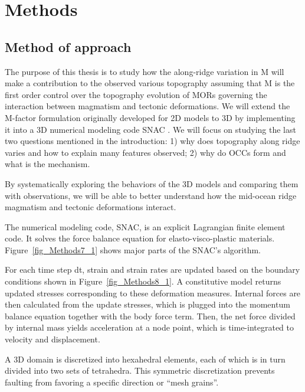 \pagebreak
\section{Methods}
\label{ch:Methods}

\subsection{Method of approach}
The purpose of this thesis is to study how the along-ridge variation in M will make a contribution to the observed various topography assuming that M is the first order control over the topography evolution of MORs governing the interaction between magmatism and tectonic deformations.
We will extend the M-factor formulation originally developed for 2D models to 3D by implementing it into a 3D numerical modeling code SNAC \citep{Choi2008}. We will focus on studying the last two questions mentioned in the introduction: 1) why does topography along ridge varies and how to explain many features observed; 2) why do OCCs form and what is the mechanism. 

By systematically exploring the behaviors of the 3D models and comparing them with observations, we will be able to better understand  how the mid-ocean ridge magmatism and tectonic deformations interact. 

The numerical modeling code, SNAC, is an explicit Lagrangian finite element code. It solves the force balance equation for elasto-visco-plastic materials. Figure~\ref{fig_Methods7_1} shows major parts of the SNAC's algorithm. 

For each time step dt, strain and strain rates are updated based on the boundary conditions shown in Figure~\ref{fig_Methods8_1}. A constitutive model returns updated stresses corresponding to these deformation measures. Internal forces are then calculated from the update stresses, which is plugged into the momentum balance equation together with the body force term. Then, the net force divided by internal mass yields acceleration at a node point, which is time-integrated to velocity and displacement. 

A 3D domain is discretized into hexahedral elements, each of which is in turn divided into two sets of tetrahedra. This symmetric discretization prevents faulting from favoring a specific direction or ``mesh grains''. 

